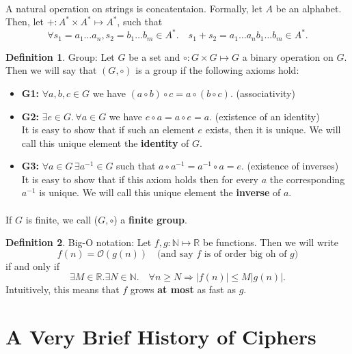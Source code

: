 \documentclass{article}
\theoremstyle{definition}
\newtheorem{definition}{Definition}[section]
\newcommand{\Oh}{\mathcal{O}}
\newcommand{\Nat}{\mathbb{N}}
\newcommand{\Reals}{\mathbb{R}}
\begin{document}
\paragraph{}
A natural operation on strings is concatentaion. Formally, let $A$ be an
alphabet. Then, let $+ : A^* \times A^* \mapsto A^*$, such that
\[
  \forall s_1 = a_1\hdots a_n, s_2 = b_1 \hdots b_m \in A^*.\quad s_1 + s_2 =
  a_1\hdots a_nb_1 \hdots b_m \in A^*.
\]
\begin{definition}{Group:}
  Let $G$ be a set and $\circ: G \times G \mapsto G$ a binary operation on $G$.
  Then we will say that $(G, \circ)$ is a group if the following axioms hold:
  \begin{itemize}
  \item \textbf{G1:} $\forall a, b, c \in G$ we have $(a \circ b) \circ c = a
    \circ (b \circ c)$. (associativity)
  \item \textbf{G2:} $\exists e \in G. \,\forall a \in G$ we have $e \circ a = a \circ e = a.$ (existence of an identity)
    \\
    It is easy to show that if such an element $e$ exists, then it
    is unique. We will call this unique element the \textbf{identity} of $G$.
    
  \item \textbf{G3:} $\forall a \in G\, \exists a^{-1} \in G$ such that $a \circ
    a^{-1} = a ^{-1} \circ a = e$. (existence of inverses)
    \\
    It is easy to show that if this axiom holds
    then for every $a$ the corresponding $a^{-1}$ is unique. We will call this
    unique element the \textbf{inverse} of $a$. 
  \end{itemize}
\end{definition}
\paragraph{} If $G$ is finite, we call ($G, \circ$) a \textbf{finite group}.
\begin{definition}{Big-O notation:} Let $f, g: \Nat \mapsto \Reals $ be
  functions. Then we will write
  \[
    f(n) = \Oh(g(n)) \quad \text{(and say $f$ is of order big oh of $g$)}
  \]
  if and only if
  \[
    \exists M \in \Reals. \exists N \in \Nat.\quad \forall n \geq N \Rightarrow
    |f(n)| \leq M|g(n)|.
  \]
  Intuitively, this means that $f$ grows \textbf{at most} as fast as $g$.
\end{definition}
\section{A Very Brief History of Ciphers}
\end{document}
